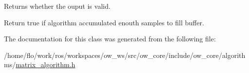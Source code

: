 Returns whether the ouput is valid. 

Return true if algorithm accumulated enouth samples to fill buffer. 

The documentation for this class was generated from the following file\+:\begin{DoxyCompactItemize}
\item 
/home/flo/work/ros/workspaces/ow\+\_\+ws/src/ow\+\_\+core/include/ow\+\_\+core/algorithms/\hyperlink{matrix__algorithm_8h}{matrix\+\_\+algorithm.\+h}\end{DoxyCompactItemize}
